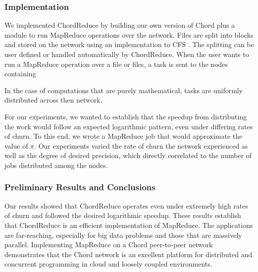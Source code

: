 \documentclass{article}
\begin{document}
\subsubsection*{Implementation}

We implemented ChordReduce by building our own version of Chord plus a module to run MapReduce operations over the network. Files are split into blocks and stored on the network using an implementation to CFS \cite{CFS}.  The splitting can be user defined or handled automatically by ChordReduce.  When the user wants to run a MapReduce operation over a file or files, a task is sent to the nodes containing 

In the case of computations that are purely mathematical, tasks are uniformly distributed across then network.


For our experiments, we wanted to establish that the speedup from distributing the work would follow an expected logarithmic pattern, even under differing rates of churn.  To this end, we wrote a MapReduce job that would approximate the value of $\pi$.  Our experiments varied the rate of churn the network experienced as well as the degree of desired precision, which directly correlated to the number of jobs distributed among the nodes.  






\subsubsection*{Preliminary Results and Conclusions}
Our results showed that ChordReduce  operates even under extremely high rates of churn and followed the desired logarithmic speedup.  These results establish that ChordReduce is an efficient implementation of MapReduce. 
The applications are far-reaching, especially for big data problems and those that are massively parallel. 
Implementing MapReduce on a Chord peer-to-peer network demonstrates that the Chord network is an excellent platform for distributed and concurrent programming in cloud and loosely coupled environments.



\end{document}
